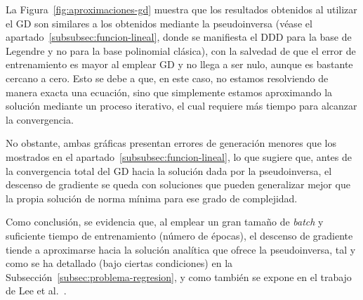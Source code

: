 La Figura~\ref{fig:aproximaciones-gd} muestra que los resultados obtenidos al utilizar el GD son similares a los obtenidos mediante la pseudoinversa (véase el apartado~\ref{subsubsec:funcion-lineal}, donde se manifiesta el DDD para la base de Legendre y no para la base polinomial clásica), con la salvedad de que el error de entrenamiento es mayor al emplear GD y no llega a ser nulo, aunque es bastante cercano a cero. Esto se debe a que, en este caso, no estamos resolviendo de manera exacta una ecuación, sino que simplemente estamos aproximando la solución mediante un proceso iterativo, el cual requiere más tiempo para alcanzar la convergencia.

No obstante, ambas gráficas presentan errores de generación menores que los mostrados en el apartado~\ref{subsubsec:funcion-lineal}, lo que sugiere que, antes de la convergencia total del GD hacia la solución dada por la pseudoinversa, el descenso de gradiente se queda con soluciones que pueden generalizar mejor que la propia solución de norma mínima para ese grado de complejidad.

Como conclusión, se evidencia que, al emplear un gran tamaño de \textit{batch} y suficiente tiempo de entrenamiento (número de épocas), el descenso de gradiente tiende a aproximarse hacia la solución analítica que ofrece la pseudoinversa, tal y como se ha detallado (bajo ciertas condiciones) en la Subsección~\ref{subsec:problema-regresion}, y como también se expone en el trabajo de Lee et al.~\cite{Lee2016}.

\endinput
